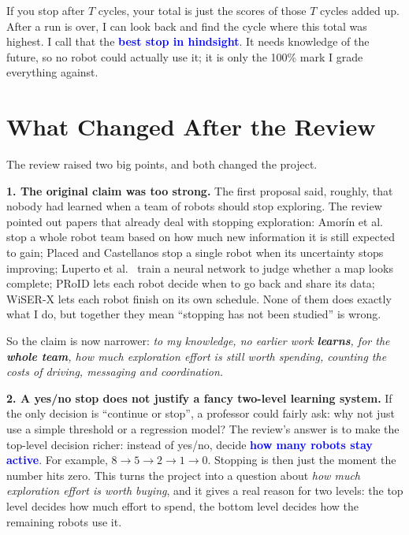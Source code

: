 \documentclass[11pt,a4paper]{article}
\newcommand{\key}[1]{\textcolor{blue}{\textbf{#1}}}
\begin{document}
If you stop after $T$ cycles, your total is just the scores of those $T$ cycles added up. After a run is over, I can look back and find the cycle where this total was highest. I call that the \key{best stop in hindsight}. It needs knowledge of the future, so no robot could actually use it; it is only the 100\% mark I grade everything against.

\section{What Changed After the Review}

The review raised two big points, and both changed the project.

\textbf{1. The original claim was too strong.} The first proposal said, roughly, that nobody had learned when a team of robots should stop exploring. The review pointed out papers that already deal with stopping exploration: Amorín et al.\ \cite{amorin2019} stop a whole robot team based on how much new information it is still expected to gain; Placed and Castellanos \cite{placed2022} stop a single robot when its uncertainty stops improving; Luperto et al.\ \cite{luperto2026} train a neural network to judge whether a map looks complete; PRoID \cite{kim2026proid} lets each robot decide when to go back and share its data; WiSER-X \cite{jadhav2026wiserx} lets each robot finish on its own schedule. None of them does exactly what I do, but together they mean ``stopping has not been studied'' is wrong.

So the claim is now narrower: \emph{to my knowledge, no earlier work \textbf{learns}, for the \textbf{whole team}, how much exploration effort is still worth spending, counting the costs of driving, messaging and coordination.}

\textbf{2. A yes/no stop does not justify a fancy two-level learning system.} If the only decision is ``continue or stop'', a professor could fairly ask: why not just use a simple threshold or a regression model? The review's answer is to make the top-level decision richer: instead of yes/no, decide \key{how many robots stay active}. For example, $8 \to 5 \to 2 \to 1 \to 0$. Stopping is then just the moment the number hits zero. This turns the project into a question about \emph{how much exploration effort is worth buying}, and it gives a real reason for two levels: the top level decides how much effort to spend, the bottom level decides how the remaining robots use it.
\end{document}
